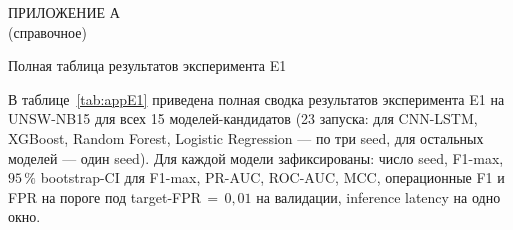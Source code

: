 \appendix

\renewcommand{\thetable}{А.\arabic{table}}
\renewcommand{\thefigure}{А.\arabic{figure}}
\setcounter{table}{0}
\setcounter{figure}{0}

{}

\newpage
\begin{center}
ПРИЛОЖЕНИЕ А\\
(справочное)

\medskip

Полная таблица результатов эксперимента E1
\end{center}
\label{app:E1-raw}

\vspace{6pt}

В таблице~\ref{tab:appE1} приведена полная сводка результатов
эксперимента E1 на UNSW-NB15 для всех 15 моделей-кандидатов
(23 запуска: для CNN-LSTM, XGBoost, Random Forest, Logistic
Regression --- по три seed, для остальных моделей --- один seed).
Для каждой модели зафиксированы: число seed, F1-max,
$95\,\%$ bootstrap-CI для F1-max, PR-AUC, ROC-AUC, MCC,
операционные F1 и FPR на пороге под target-FPR$\,=\,0{,}01$
на валидации, inference latency на одно окно.

